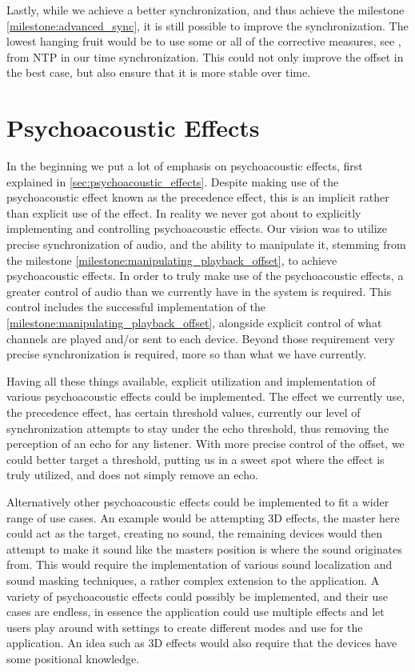 Lastly, while we achieve a better synchronization, and thus achieve the milestone \ref{milestone:advanced_sync}, it is still possible to improve the synchronization.
The lowest hanging fruit would be to use some or all of the corrective measures, see , from \ac{NTP} in our time synchronization.
This could not only improve the offset in the best case, but also ensure that it is more stable over time.

\section{Psychoacoustic Effects}
In the beginning we put a lot of emphasis on psychoacoustic effects, first explained in \cref{sec:psychoacoustic_effects}.
Despite making use of the psychoacoustic effect known as the precedence effect, this is an implicit rather than explicit use of the effect.
In reality we never got about to explicitly implementing and controlling psychoacoustic effects.
Our vision was to utilize precise synchronization of audio, and the ability to manipulate it, stemming from the milestone \ref{milestone:manipulating_playback_offset}, to achieve psychoacoustic effects.
In order to truly make use of the psychoacoustic effects, a greater control of audio than we currently have in the system is required.
This control includes the successful implementation of the \ref{milestone:manipulating_playback_offset}, alongside explicit control of what channels are played and/or sent to each device.
Beyond those requirement very precise synchronization is required, more so than what we have currently.

Having all these things available, explicit utilization and implementation of various psychoacoustic effects could be implemented.
The effect we currently use, the precedence effect, has certain threshold values, currently our level of synchronization attempts to stay under the echo threshold, thus removing the perception of an echo for any listener.
With more precise control of the offset, we could better target a threshold, putting us in a sweet spot where the effect is truly utilized, and does not simply remove an echo.

Alternatively other psychoacoustic effects could be implemented to fit a wider range of use cases.
An example would be attempting 3D effects, the master here could act as the target, creating no sound, the remaining devices would then attempt to make it sound like the masters position is where the sound originates from.
This would require the implementation of various sound localization and sound masking techniques, a rather complex extension to the application.
A variety of psychoacoustic effects could possibly be implemented, and their use cases are endless, in essence the application could use multiple effects and let users play around with settings to create different modes and use for the application.
An idea such as 3D effects would also require that the devices have some positional knowledge.


